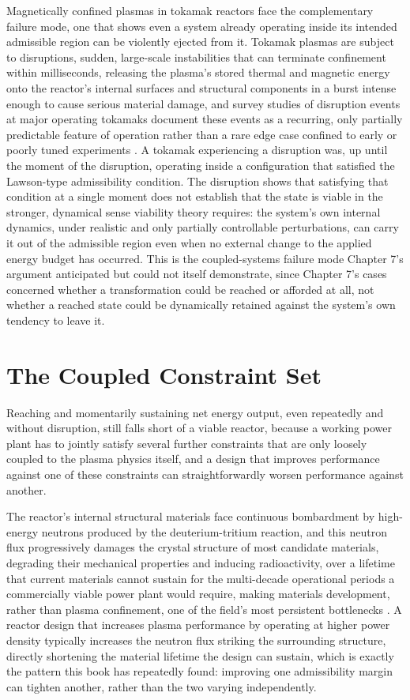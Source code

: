 \documentclass[11pt]{book}
\begin{document}
Magnetically confined plasmas in tokamak reactors face the complementary failure mode, one that shows even a system already operating inside its intended admissible region can be violently ejected from it. Tokamak plasmas are subject to disruptions, sudden, large-scale instabilities that can terminate confinement within milliseconds, releasing the plasma's stored thermal and magnetic energy onto the reactor's internal surfaces and structural components in a burst intense enough to cause serious material damage, and survey studies of disruption events at major operating tokamaks document these events as a recurring, only partially predictable feature of operation rather than a rare edge case confined to early or poorly tuned experiments \cite{devries2011}. A tokamak experiencing a disruption was, up until the moment of the disruption, operating inside a configuration that satisfied the Lawson-type admissibility condition. The disruption shows that satisfying that condition at a single moment does not establish that the state is viable in the stronger, dynamical sense viability theory requires: the system's own internal dynamics, under realistic and only partially controllable perturbations, can carry it out of the admissible region even when no external change to the applied energy budget has occurred. This is the coupled-systems failure mode Chapter 7's argument anticipated but could not itself demonstrate, since Chapter 7's cases concerned whether a transformation could be reached or afforded at all, not whether a reached state could be dynamically retained against the system's own tendency to leave it.

\section{The Coupled Constraint Set}

Reaching and momentarily sustaining net energy output, even repeatedly and without disruption, still falls short of a viable reactor, because a working power plant has to jointly satisfy several further constraints that are only loosely coupled to the plasma physics itself, and a design that improves performance against one of these constraints can straightforwardly worsen performance against another.

The reactor's internal structural materials face continuous bombardment by high-energy neutrons produced by the deuterium-tritium reaction, and this neutron flux progressively damages the crystal structure of most candidate materials, degrading their mechanical properties and inducing radioactivity, over a lifetime that current materials cannot sustain for the multi-decade operational periods a commercially viable power plant would require, making materials development, rather than plasma confinement, one of the field's most persistent bottlenecks \cite{zinkle2013}. A reactor design that increases plasma performance by operating at higher power density typically increases the neutron flux striking the surrounding structure, directly shortening the material lifetime the design can sustain, which is exactly the pattern this book has repeatedly found: improving one admissibility margin can tighten another, rather than the two varying independently.
\end{document}
